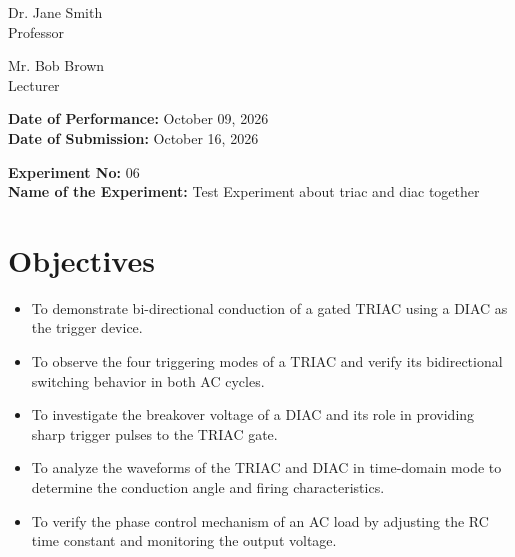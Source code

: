 \documentclass[12pt,a4paper]{article}
\begin{document}
\begin{titlepage}
\begin{minipage}[t]{0.5\textwidth}
\begin{flushright}
            Dr. Jane Smith \\
            Professor \\
            \vspace{0.3cm}
            
            Mr. Bob Brown \\
            Lecturer \\
            
            
        \end{flushright}
    \end{minipage}

    \vfill
    \textbf{Date of Performance:} October 09, 2026 \\
    \textbf{Date of Submission:} October 16, 2026
    
\end{titlepage}

\setcounter{page}{1}
\rmfamily %
\normalsize

\begin{center}
    \textbf{Experiment No:} 06 \\
    \vspace{0.2cm}
    \textbf{Name of the Experiment:} Test Experiment about triac and diac together
\end{center}
\vspace{0.5cm}


\section{Objectives}
\begin{itemize}

    \item To demonstrate bi-directional conduction of a gated TRIAC using a DIAC as the trigger device.

    \item To observe the four triggering modes of a TRIAC and verify its bidirectional switching behavior in both AC cycles.

    \item To investigate the breakover voltage of a DIAC and its role in providing sharp trigger pulses to the TRIAC gate.

    \item To analyze the waveforms of the TRIAC and DIAC in time-domain mode to determine the conduction angle and firing characteristics.

    \item To verify the phase control mechanism of an AC load by adjusting the RC time constant and monitoring the output voltage.

\end{itemize}
\end{document}
